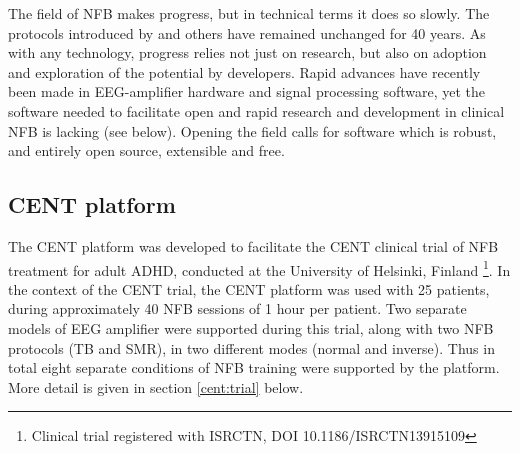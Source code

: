 \documentclass[fleqn,10pt]{wlpeerj}
\begin{document}
The field of NFB makes progress, but in technical terms it does so slowly. The protocols introduced by \cite{Lubar1976} and others have remained unchanged for 40 years. As with any technology, progress relies not just on research, but also on adoption and exploration of the potential by developers. Rapid advances have recently been made in EEG-amplifier hardware and signal processing software, yet the software needed to facilitate open and rapid research and development in clinical NFB is lacking (see below). Opening the field calls for software which is robust, and entirely open source, extensible and free.





%
%
%
%
%



\subsection{CENT platform}

The CENT platform was developed to facilitate the CENT clinical trial of NFB treatment for adult ADHD, conducted at the University of Helsinki, Finland \footnote{Clinical trial registered with ISRCTN, DOI 10.1186/ISRCTN13915109}. In the context of the CENT trial, the CENT platform was used with 25 patients, during approximately 40 NFB sessions of 1 hour per patient. Two separate models of EEG amplifier were supported during this trial, along with two NFB protocols (TB and SMR), in two different modes (normal and inverse).  Thus in total eight separate conditions of NFB training were supported by the platform. More detail is given in section \ref{cent:trial} below.
\end{document}

